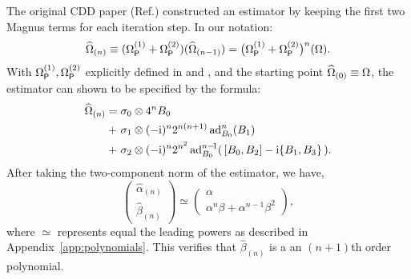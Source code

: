 \documentclass[aps,pra,reprint,superscriptaddress]{revtex4-2}
\newcommand{\Opdd}{\Omega_{\mathsf{P}}}
\begin{document}
The original CDD paper (Ref.\cite{khodjasteh2005fault}) constructed an estimator by keeping the first two Magnus terms for each iteration step. In
our notation:
\begin{equation}
    \Ohat_{(n)} \equiv (\Opdd\up{1} + \Opdd\up{2}) (\Ohat_{(n-1)}) = \big(\Opdd\up{1} + \Opdd\up{2}\big)^n (\Omega).
\end{equation}
With $\Opdd\up{1}, \Opdd\up{2}$ explicitly defined in  and , and the starting point $\widehat{\Omega}_{(0)}\equiv\Omega$,  the estimator can shown to be specified by the formula:
\begin{align}\label{eq:cdd-estimator}
\widehat{\Omega}_{(n)} 
={} & \sigma_0 \otimes 4^n B_0 \notag \\
+\ & \sigma_1 \otimes (-\mathrm{i})^{n} 2^{n(n+1)} \operatorname{ad}_{B_0}^{n}(B_1)\\ 
+\ & \sigma_2 \otimes (-\mathrm{i})^{n} 2^{n^2} \operatorname{ad}_{B_0}^{n-\!1}( \,[B_0,B_2] - \mathrm{i} \{B_1,B_3\} \,). \notag
\end{align} 
After taking the two-component norm of the estimator, we have,
\begin{equation}
\begin{pmatrix}
\widehat\alpha_{(n)}\\
\widehat\beta_{(n)}
\end{pmatrix}
\simeq
\begin{pmatrix}
\alpha\\
\alpha^{n} \beta +\alpha^{n-1} \beta^2
\end{pmatrix},
\end{equation}
where $\simeq$ represents equal the leading powers as described in Appendix~\ref{app:polynomials}. 
This verifies that $\widehat\beta_{(n)}$ is a an $(n+1)$th order polynomial.
\end{document}
